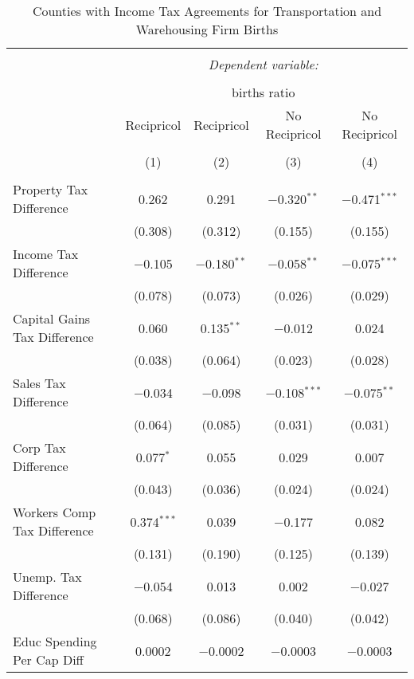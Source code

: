 
\begin{table}[!htbp] \centering 
  \caption{Counties with Income Tax Agreements for  Transportation and Warehousing Firm Births} 
  \label{48-49agreement} 
\begin{tabular}{@{\extracolsep{5pt}}lcccc} 
\\[-1.8ex]\hline 
\hline \\[-1.8ex] 
 & \multicolumn{4}{c}{\textit{Dependent variable:}} \\ 
\cline{2-5} 
\\[-1.8ex] & \multicolumn{4}{c}{births ratio} \\ 
 & Recipricol & Recipricol & No Recipricol & No Recipricol \\ 
\\[-1.8ex] & (1) & (2) & (3) & (4)\\ 
\hline \\[-1.8ex] 
 Property Tax Difference & 0.262 & 0.291 & $-$0.320$^{**}$ & $-$0.471$^{***}$ \\ 
  & (0.308) & (0.312) & (0.155) & (0.155) \\ 
  Income Tax Difference & $-$0.105 & $-$0.180$^{**}$ & $-$0.058$^{**}$ & $-$0.075$^{***}$ \\ 
  & (0.078) & (0.073) & (0.026) & (0.029) \\ 
  Capital Gains Tax Difference & 0.060 & 0.135$^{**}$ & $-$0.012 & 0.024 \\ 
  & (0.038) & (0.064) & (0.023) & (0.028) \\ 
  Sales Tax Difference & $-$0.034 & $-$0.098 & $-$0.108$^{***}$ & $-$0.075$^{**}$ \\ 
  & (0.064) & (0.085) & (0.031) & (0.031) \\ 
  Corp Tax Difference & 0.077$^{*}$ & 0.055 & 0.029 & 0.007 \\ 
  & (0.043) & (0.036) & (0.024) & (0.024) \\ 
  Workers Comp Tax Difference & 0.374$^{***}$ & 0.039 & $-$0.177 & 0.082 \\ 
  & (0.131) & (0.190) & (0.125) & (0.139) \\ 
  Unemp. Tax Difference & $-$0.054 & 0.013 & 0.002 & $-$0.027 \\ 
  & (0.068) & (0.086) & (0.040) & (0.042) \\ 
  Educ Spending Per Cap Diff & 0.0002 & $-$0.0002 & $-$0.0003 & $-$0.0003 \\ 

\end{tabular}
\end{table}
